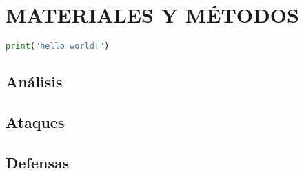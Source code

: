 \chapter{MATERIALES Y MÉTODOS}

\begin{lstlisting}[language=Python,caption={Example code},breaklines=true,label={code:compose}]
print("hello world!")
\end{lstlisting}


\section{Análisis}

\section{Ataques}

\section{Defensas}

